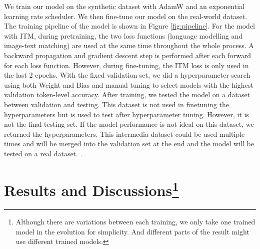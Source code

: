 \documentclass[12pt]{article}
\begin{document}
We train our model on the synthetic dataset with AdamW \autocite{adamw} and an exponential learning rate scheduler. We then fine-tune our model on the real-world dataset. The training pipeline of the model is shown in Figure \ref{fig:pipeline}. For the model with ITM, during pretraining, the two loss functions (language modelling and image-text matching) are used at the same time throughout the whole process. A backward propagation and gradient descent step is performed after each forward for each loss function. However, during fine-tuning, the ITM loss is only used in the last 2 epochs. 
With the fixed validation set, we did a hyperparameter search using both Weight and Bias \autocite{wandb} and manual tuning to select models with the highest validation token-level accuracy.  
After training, we tested the model on a dataset between validation and testing. This dataset is not used in finetuning the hyperparameters but is used to test after hyperparameter tuning. However, it is not the final testing set. If the model performance is not ideal on this dataset, we returned the hyperparameters. This intermedia dataset could be used multiple times and will be merged into the validation set at the end and the model will be tested on a real dataset.
.
\section[Results and Discussions]{Results and Discussions\footnote{Although there are variations between each training, we only take one trained model in the evolution for simplicity. And different parts of the result might use different trained models. }}
\end{document}
